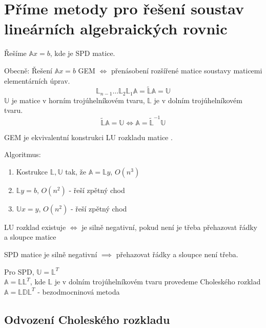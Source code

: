\documentclass[../main.tex]{subfiles}
\begin{document}
\section{Příme metody pro řešení soustav lineárních algebraických rovnic}
Řešíme $\mathbb{A}x = b$, kde \matA je SPD matice.

Obecně: Řešení $\mathbb{A}x = b$ GEM $\Leftrightarrow$ přenásobení rozšířené matice soustavy maticemi 
elementárních úprav. 
\begin{equation*}
    \mathbb{L}_{n-1}\dots\mathbb{L}_{2}\mathbb{L}_{1}\mathbb{A} = \tilde{\mathbb{L}}\mathbb{A} = \mathbb{U}
\end{equation*}
$\mathbb{U}$ je matice v horním trojúhelníkovém tvaru, $\mathbb{L}$ je v dolním trojúhelníkovém tvaru.
\begin{equation*}
    \tilde{\mathbb{L}}\mathbb{A}=\mathbb{U} \Leftrightarrow \mathbb{A} = \tilde{\mathbb{L}}^{-1}\mathbb{U}
\end{equation*}

GEM je ekvivalentní konstrukci LU rozkladu matice \matA .

Algoritmus:
\begin{enumerate}
    \item Kostrukce $\mathbb{L}, \mathbb{U}$ tak, že $\mathbb{A} = \mathbb{L} y$, $O(n^3)$
    \item $\mathbb{L} y = b$, $O(n^2)$ - řeší zpětný chod
    \item $\mathbb{U} x = y$, $O(n^2)$ - řeší zpětný chod
\end{enumerate}


LU rozklad existuje $\Leftrightarrow$ \matA je silně negativní, pokud není je třeba přehazovat
řádky a sloupce matice \matA

SPD matice je silně negativní $\implies$ přehazovat řádky a sloupce není třeba.




Pro \matA SPD, $\mathbb{U} = \mathbb{L}^T$\\
$\mathbb{A} = \mathbb{L}\mathbb{L}^T$, kde $\mathbb{L}$ je v dolním trojúhelníkovém tvaru provedeme Choleského rozklad\\
$\mathbb{A} = \mathbb{L}\mathbb{D}\mathbb{L}^T$ - bezodmocninová metoda 





\subsection{Odvození Choleského rozkladu}
\end{document}
